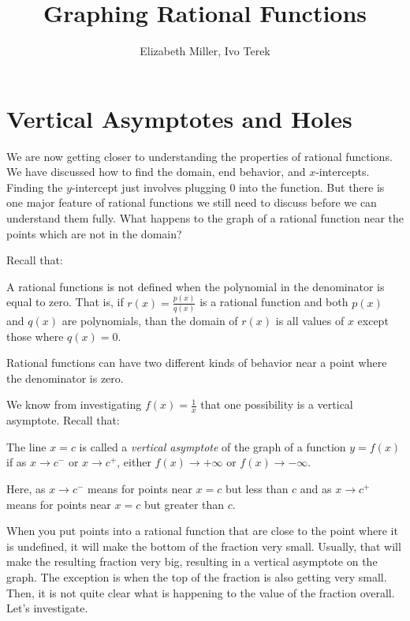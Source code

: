 \documentclass{ximera}
\author{Elizabeth Miller, Ivo Terek}
\title{Graphing Rational Functions}
\begin{document}
\licenseSZ
\begin{abstract}
\end{abstract}
\maketitle

\section{Vertical Asymptotes and Holes}

We are now getting closer to understanding the properties of rational functions.  We have discussed how to find the domain, end behavior, and $x$-intercepts.  Finding the $y$-intercept just involves plugging $0$ into the function.  But there is one major feature of rational functions we still need to discuss before we can understand them fully.  What happens to the graph of a rational function near the points which are not in the domain?  

Recall that:

\begin{callout}
A rational functions is not defined when the polynomial in the denominator is equal to zero.  That is, if $r(x)=\frac{p(x)}{q(x)}$ is a rational function and both $p(x)$ and $q(x)$ are polynomials, than the domain of $r(x)$ is all values of $x$ except those where $q(x)=0$.  
\end{callout}

Rational functions can have two different kinds of behavior near a point where the denominator is zero.  

We know from investigating $f(x)=\frac{1}{x}$ that one possibility is a vertical asymptote.  Recall that:

\begin{definition}
The line $x=c$ is called a \emph{vertical asymptote} of the graph of a function $y=f(x)$ if as $x \to c^-$ or $x \to c^+$, either $f(x) \to +\infty$ or $f(x) \to -\infty$.  

Here, as $x \to c^-$ means for points near $x=c$ but less than $c$ and as $x \to c^+$ means for points near $x=c$ but greater than $c$.
\end{definition}

When you put points into a rational function that are close to the point where it is undefined, it will make the bottom of the fraction very small.  Usually, that will make the resulting fraction very big, resulting in a vertical asymptote on the graph.  The exception is when the top of the fraction is also getting very small.  Then, it is not quite clear what is happening to the value of the fraction overall.  Let's investigate.
\end{document}
